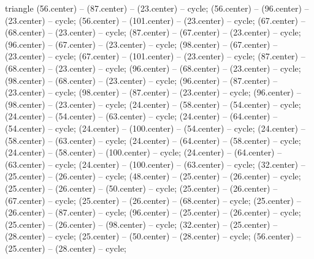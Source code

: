 \begin{pgfonlayer}{triangle}
 (56.center) -- (87.center) -- (23.center) -- cycle; 
 (56.center) -- (96.center) -- (23.center) -- cycle; 
 (56.center) -- (101.center) -- (23.center) -- cycle; 
 (67.center) -- (68.center) -- (23.center) -- cycle; 
 (87.center) -- (67.center) -- (23.center) -- cycle; 
 (96.center) -- (67.center) -- (23.center) -- cycle; 
 (98.center) -- (67.center) -- (23.center) -- cycle; 
 (67.center) -- (101.center) -- (23.center) -- cycle; 
 (87.center) -- (68.center) -- (23.center) -- cycle; 
 (96.center) -- (68.center) -- (23.center) -- cycle; 
 (98.center) -- (68.center) -- (23.center) -- cycle; 
 (96.center) -- (87.center) -- (23.center) -- cycle; 
 (98.center) -- (87.center) -- (23.center) -- cycle; 
 (96.center) -- (98.center) -- (23.center) -- cycle; 
 (24.center) -- (58.center) -- (54.center) -- cycle; 
 (24.center) -- (54.center) -- (63.center) -- cycle; 
 (24.center) -- (64.center) -- (54.center) -- cycle; 
 (24.center) -- (100.center) -- (54.center) -- cycle; 
 (24.center) -- (58.center) -- (63.center) -- cycle; 
 (24.center) -- (64.center) -- (58.center) -- cycle; 
 (24.center) -- (58.center) -- (100.center) -- cycle; 
 (24.center) -- (64.center) -- (63.center) -- cycle; 
 (24.center) -- (100.center) -- (63.center) -- cycle; 
 (32.center) -- (25.center) -- (26.center) -- cycle; 
 (48.center) -- (25.center) -- (26.center) -- cycle; 
 (25.center) -- (26.center) -- (50.center) -- cycle; 
 (25.center) -- (26.center) -- (67.center) -- cycle; 
 (25.center) -- (26.center) -- (68.center) -- cycle; 
 (25.center) -- (26.center) -- (87.center) -- cycle; 
 (96.center) -- (25.center) -- (26.center) -- cycle; 
 (25.center) -- (26.center) -- (98.center) -- cycle; 
 (32.center) -- (25.center) -- (28.center) -- cycle; 
 (25.center) -- (50.center) -- (28.center) -- cycle; 
 (56.center) -- (25.center) -- (28.center) -- cycle; 

\end{pgfonlayer}
